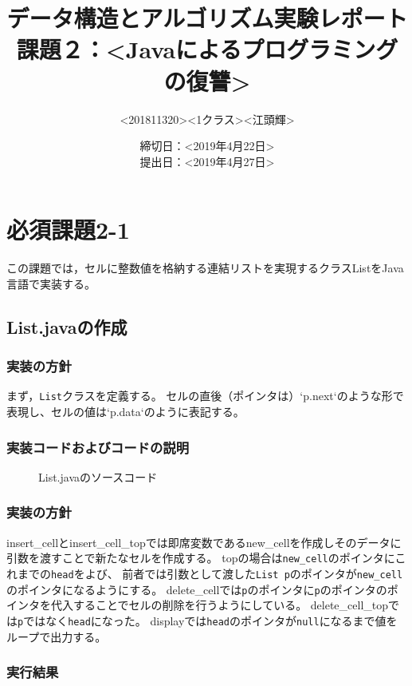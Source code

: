 \documentclass[10.5pt,a4paper]{jsarticle}
\title{データ構造とアルゴリズム実験レポート\\課題２：\textless Javaによるプログラミングの復讐\textgreater}
\author{\textless 201811320\textgreater \textless 1クラス\textgreater \textless 江頭輝\textgreater}
\date{締切日：\textless 2019年4月22日\textgreater\\提出日：\textless 2019年4月27日\textgreater}
\begin{document}
\maketitle

\section{必須課題2-1}

この課題では，セルに整数値を格納する連結リストを実現するクラスListをJava言語で実装する。

\subsection{List.javaの作成}
\subsubsection{実装の方針}
まず，\texttt{List}クラスを定義する。
セルの直後（ポインタは）`p.next`のような形で表現し、セルの値は`p.data`のように表記する。

\subsubsection{実装コードおよびコードの説明}

\begin{figure}[t]
  \begin{center}
   
   \caption{List.javaのソースコード}
  \end{center}
\end{figure}

\subsubsection{実装の方針}\label{sec:ls_impl_policy}

insert_cellとinsert_cell_topでは即席変数であるnew_cellを作成しそのデータに引数を渡すことで新たなセルを作成する。
topの場合は\texttt{new_cell}のポインタにこれまでの\texttt{head}をよび、
前者では引数として渡した\texttt{List p}のポインタが\texttt{new_cell}のポインタになるようにする。
delete_cellでは\texttt{p}のポインタに\texttt{p}のポインタのポインタを代入することでセルの削除を行うようにしている。
delete_cell_topでは\texttt{p}ではなく\texttt{head}になった。
displayでは\texttt{head}のポインタが\texttt{null}になるまで値をループで出力する。

\subsubsection{実行結果}\label{sec:ls_code_exec}
\end{document}
